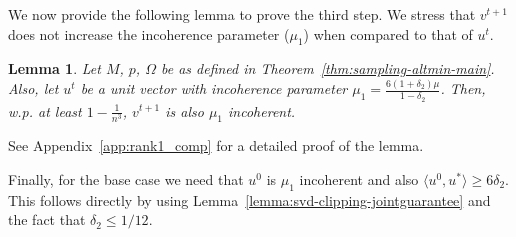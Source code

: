 \documentclass[11pt]{article}
\theoremstyle{plain}
\newtheorem{lemma}[theorem]{Lemma}
\theoremstyle{definition}
\newcommand{\vto}{v^{t+1}}
\newcommand{\ut}{u^t}
\newcommand{\uo}{u^* }
\newcommand{\vo}{v^* }
\newcommand{\ip}[2]{\langle #1, #2 \rangle}
\newcommand{\vt}{\vto}
\begin{document}
We now provide the following lemma to prove the third step. We stress that $\vt$ does not increase the incoherence parameter ($\mu_1$) when compared to that of $\ut$. %
\begin{lemma}  \label{lem:incoherence_vt}
Let $M$, $p$, $\Omega$ be as defined in Theorem~\ref{thm:sampling-altmin-main}. Also, let $\ut$ be a unit vector with incoherence parameter $\mu_1=\frac{6(1+\delta_2)\mu}{1-\delta_2}$. 
 Then, w.p. at least $1-\frac{1}{n^3}$, $\vt$ is also $\mu_1$ incoherent. 
\end{lemma}
See Appendix~\ref{app:rank1_comp} for a detailed proof of the lemma. 

Finally, for the base case we need that $u^0$ is $\mu_1$ incoherent and also $\ip{u^0}{\uo}\geq 6\delta_2$. This follows directly by using Lemma~\ref{lemma:svd-clipping-jointguarantee} and the fact that $\delta_2\leq 1/12$. 
\end{document}
